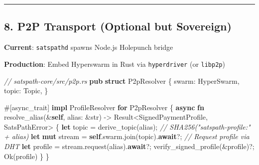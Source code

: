 \documentclass[
]{article}
\newenvironment{Shaded}{}{}
\newcommand{\AttributeTok}[1]{\textcolor[rgb]{0.49,0.56,0.16}{#1}}
\newcommand{\CommentTok}[1]{\textcolor[rgb]{0.38,0.63,0.69}{\textit{#1}}}
\newcommand{\ConstantTok}[1]{\textcolor[rgb]{0.53,0.00,0.00}{#1}}
\newcommand{\ControlFlowTok}[1]{\textcolor[rgb]{0.00,0.44,0.13}{\textbf{#1}}}
\newcommand{\DataTypeTok}[1]{\textcolor[rgb]{0.56,0.13,0.00}{#1}}
\newcommand{\KeywordTok}[1]{\textcolor[rgb]{0.00,0.44,0.13}{\textbf{#1}}}
\newcommand{\NormalTok}[1]{#1}
\newcommand{\OperatorTok}[1]{\textcolor[rgb]{0.40,0.40,0.40}{#1}}
\begin{document}
\begin{center}\rule{0.5\linewidth}{0.5pt}\end{center}

\hypertarget{p2p-transport-optional-but-sovereign}{%
\subsection{8. P2P Transport (Optional but
Sovereign)}\label{p2p-transport-optional-but-sovereign}}

\textbf{Current}: \texttt{satspathd} spawns Node.js Holepunch bridge

\textbf{Production}: Embed Hyperswarm in Rust via \texttt{hyperdriver}
(or \texttt{libp2p})

\begin{Shaded}
\begin{Highlighting}[]
\CommentTok{// satspath{-}core/src/p2p.rs}
\KeywordTok{pub} \KeywordTok{struct}\NormalTok{ P2pResolver }\OperatorTok{\{}
\NormalTok{    swarm}\OperatorTok{:}\NormalTok{ HyperSwarm}\OperatorTok{,}
\NormalTok{    topic}\OperatorTok{:}\NormalTok{ Topic}\OperatorTok{,}
\OperatorTok{\}}

\AttributeTok{\#[}\NormalTok{async\_trait}\AttributeTok{]}
\KeywordTok{impl}\NormalTok{ ProfileResolver }\ControlFlowTok{for}\NormalTok{ P2pResolver }\OperatorTok{\{}
    \KeywordTok{async} \KeywordTok{fn}\NormalTok{ resolve\_alias(}\OperatorTok{\&}\KeywordTok{self}\OperatorTok{,}\NormalTok{ alias}\OperatorTok{:} \OperatorTok{\&}\DataTypeTok{str}\NormalTok{) }\OperatorTok{{-}\textgreater{}} \DataTypeTok{Result}\OperatorTok{\textless{}}\NormalTok{SignedPaymentProfile}\OperatorTok{,}\NormalTok{ SatsPathError}\OperatorTok{\textgreater{}} \OperatorTok{\{}
        \KeywordTok{let}\NormalTok{ topic }\OperatorTok{=}\NormalTok{ derive\_topic(alias)}\OperatorTok{;}  \CommentTok{// SHA256("satspath{-}profile:" + alias)}
        \KeywordTok{let} \KeywordTok{mut}\NormalTok{ stream }\OperatorTok{=} \KeywordTok{self}\OperatorTok{.}\NormalTok{swarm}\OperatorTok{.}\NormalTok{join(topic)}\OperatorTok{.}\KeywordTok{await}\OperatorTok{?;}
        \CommentTok{// Request profile via DHT}
        \KeywordTok{let}\NormalTok{ profile }\OperatorTok{=}\NormalTok{ stream}\OperatorTok{.}\NormalTok{request(alias)}\OperatorTok{.}\KeywordTok{await}\OperatorTok{?;}
\NormalTok{        verify\_signed\_profile(}\OperatorTok{\&}\NormalTok{profile)}\OperatorTok{?;}
        \ConstantTok{Ok}\NormalTok{(profile)}
    \OperatorTok{\}}
\OperatorTok{\}}
\end{Highlighting}
\end{Shaded}
\end{document}
